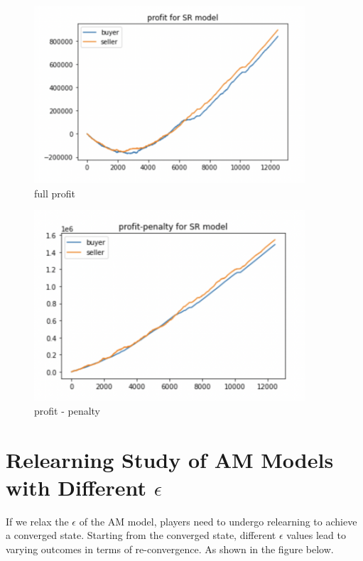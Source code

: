 \documentclass[11pt]{article}
\begin{document}
\begin{figure}[H]
	\begin{center}
	\includegraphics[width=0.9\textwidth]{56.PNG}
	\end{center}
	\caption{full profit}
	\label{FIG.56}
\end{figure}

\begin{figure}[H]
	\begin{center}
	\includegraphics[width=0.9\textwidth]{57.PNG}
	\end{center}
	\caption{profit - penalty}
	\label{FIG.57}
\end{figure}	


\section{Relearning Study of AM Models with Different $\epsilon$}

If we relax the $\epsilon$ of the AM model, players need to undergo relearning 
to achieve a converged state. Starting from the converged state, different $\epsilon$
values lead to varying outcomes in terms of re-convergence. As shown in the figure below.
\end{document}
